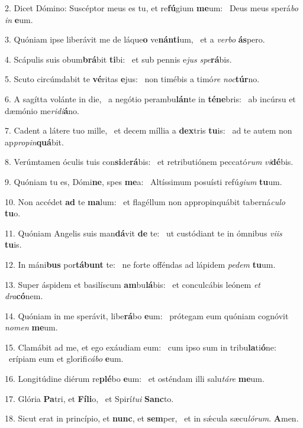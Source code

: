 2. Dicet Dómino: Suscéptor meus es tu, et re\textbf{fú}gium \textbf{me}um: \ast\  Deus meus sperá\textit{bo} \textit{in} \textbf{e}um.\

3. Quóniam ipse liberávit me de láque\textbf{o} ve\textbf{nán}\textbf{ti}um, \ast\  et a \textit{ver}\textit{bo} \textbf{ás}pero.\

4. Scápulis suis obum\textbf{brá}bit \textbf{ti}bi: \ast\  et sub pennis e\textit{jus} \textit{spe}\textbf{rá}bis.\

5. Scuto circúmdabit te \textbf{vé}ritas \textbf{e}jus: \ast\  non timébis a timó\textit{re} \textit{noc}\textbf{túr}no.\

6. A sagítta volánte in die, \dag\  a negótio perambu\textbf{lán}te in \textbf{té}\textbf{ne}bris: \ast\  ab incúrsu et dæmónio me\textit{ri}\textit{di}\textbf{á}no.\

7. Cadent a látere tuo mille, \dag\  et decem míllia a \textbf{dex}tris \textbf{tu}is: \ast\  ad te autem non ap\textit{pro}\textit{pin}\textbf{quá}bit.\

8. Verúmtamen óculis tuis con\textbf{si}de\textbf{rá}bis: \ast\  et retributiónem peccató\textit{rum} \textit{vi}\textbf{dé}bis.\

9. Quóniam tu es, Dómi\textbf{ne}, spes \textbf{me}a: \ast\  Altíssimum posuísti refú\textit{gi}\textit{um} \textbf{tu}um.\

10. Non accédet \textbf{ad} te \textbf{ma}lum: \ast\  et flagéllum non appropinquábit taberná\textit{cu}\textit{lo} \textbf{tu}o.\

11. Quóniam Angelis suis man\textbf{dá}vit \textbf{de} te: \ast\  ut custódiant te in ómnibus \textit{vi}\textit{is} \textbf{tu}is.\

12. In máni\textbf{bus} por\textbf{tá}\textbf{bunt} te: \ast\  ne forte offéndas ad lápidem \textit{pe}\textit{dem} \textbf{tu}um.\

13. Super áspidem et basilíscum \textbf{am}bu\textbf{lá}bis: \ast\  et conculcábis leónem \textit{et} \textit{dra}\textbf{có}nem.\

14. Quóniam in me sperávit, libe\textbf{rá}bo \textbf{e}um: \ast\  prótegam eum quóniam cognóvit \textit{no}\textit{men} \textbf{me}um.\

15. Clamábit ad me, et ego exáudiam eum: \dag\  cum ipso sum in tribu\textbf{la}ti\textbf{ó}ne: \ast\  erípiam eum et glorifi\textit{cá}\textit{bo} \textbf{e}um.\

16. Longitúdine diérum re\textbf{plé}bo \textbf{e}um: \ast\  et osténdam illi salu\textit{tá}\textit{re} \textbf{me}um.\

17. Glória \textbf{Pa}tri, et \textbf{Fí}\textbf{li}o, \ast\  et Spirí\textit{tu}\textit{i} \textbf{Sanc}to.\

18. Sicut erat in princípio, et \textbf{nunc}, et \textbf{sem}per, \ast\  et in sǽcula sæcu\textit{ló}\textit{rum}. \textbf{A}men.\

